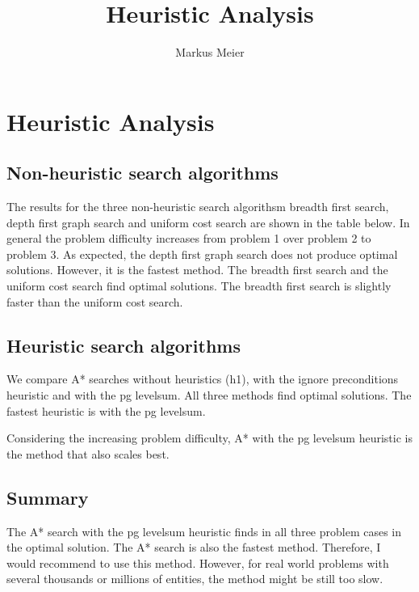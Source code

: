 \documentclass[12pt,a4paper]{article}
\author{Markus Meier}
\title{Heuristic Analysis}
\begin{document}
\section{Heuristic Analysis}
\subsection{Non-heuristic search algorithms}
The results for the three non-heuristic search algorithsm breadth first search, depth first graph search and uniform cost search are shown in the table below.
In general the problem difficulty increases from problem 1 over problem 2 to problem 3.
As expected, the depth first graph search does not produce optimal solutions. However, it is the fastest method.
The breadth first search and the uniform cost search find optimal solutions.
The breadth first search is slightly faster than the uniform cost search.

\subsection{Heuristic search algorithms}
We compare A* searches without heuristics (h1), with the ignore preconditions heuristic and with the pg levelsum. All three methods find optimal solutions. The fastest heuristic is with the pg levelsum.

Considering the increasing problem difficulty, A* with the pg levelsum heuristic is the method that also scales best.

\subsection{Summary}
The A* search with the pg levelsum heuristic finds in all three problem cases in the optimal solution. The A* search is also the fastest method. Therefore, I would recommend to use this method. However, for real world problems with several thousands or millions of entities, the method might be still too slow.
\end{document}

